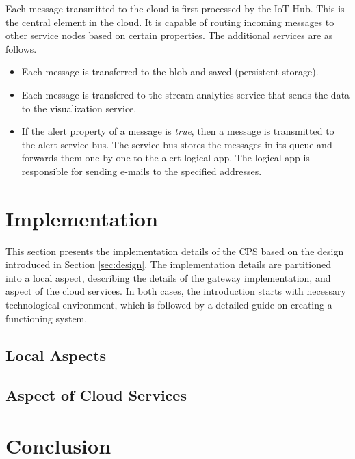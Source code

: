 \documentclass[a4paper, 11pt]{article}
\begin{document}
	Each message transmitted to the cloud is first processed by the IoT Hub. This is the central element in the cloud. It is 	capable of routing incoming messages to other service nodes based on certain properties. The additional services are as follows.
	 \begin{itemize}
	 	\item Each message is transferred to the blob and saved (persistent storage).
		\item Each message is transfered to the stream analytics service that sends the data to the visualization service.
	 	\item If the alert property of a message is \textsl{true}, then a message is transmitted to the alert service bus. The service bus stores the messages in its queue and forwards them one-by-one to the alert logical app. The logical app is responsible for sending e-mails to the specified addresses.
	 \end{itemize}
	
	\section{Implementation}
	\label{sec:implementation}
	This section presents the implementation details of the CPS based on the design introduced in Section \ref{sec:design}. The implementation details are partitioned into a local aspect, describing the details of the gateway implementation, and aspect of the cloud services. In both cases, the introduction starts with necessary technological environment, which is followed by a detailed guide on creating a functioning system.
	
	\subsection{Local Aspects}
	
	\subsection{Aspect of Cloud Services}
	
	\section{Conclusion}
	
\end{document}
